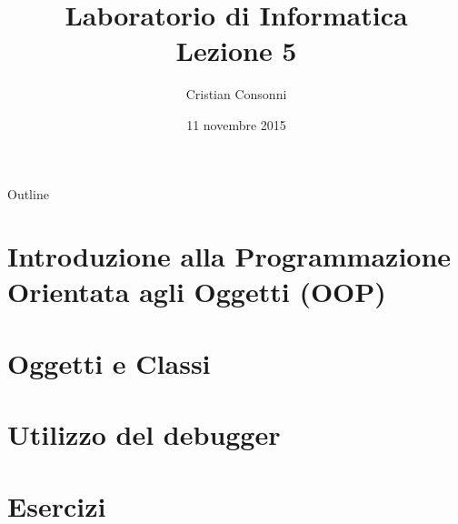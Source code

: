 \documentclass[10pt]{beamer}
\title[Laboratorio di Informatica - Lezione 5]{Laboratorio di Informatica \\ Lezione 5}
\author[Cristian Consonni]{Cristian Consonni}
\date[28/10/2015]{11 novembre 2015}
\institute[UniTN]{Università degli Studi di Trento}
\begin{document}
\begin{frame}
  \titlepage
\end{frame}

\begin{frame}{Outline}
  \tableofcontents
\end{frame}



\section{Introduzione alla Programmazione Orientata agli Oggetti (OOP)}


\section{Oggetti e Classi}


\section{Utilizzo del debugger}


\section{Esercizi}


% 
\end{document}
